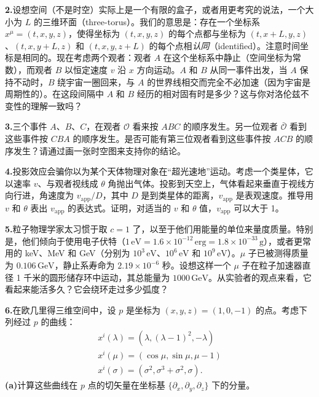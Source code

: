 \textbf{2.}\quad 设想空间（不是时空）实际上是一个有限的盒子，或者用更考究的说法，一个大小为 $L$ 的三维环面（three-torus）。我们的意思是：存在一个坐标系 $x^{\mu}=(t,x,y,z)$，使得坐标为 $(t,x,y,z)$ 的每个点都与坐标为 $(t,x+L,y,z)$、$(t,x,y+L,z)$ 和 $(t,x,y,z+L)$ 的每个点相\emph{认同}（identified）。注意时间坐标是相同的。现在考虑两个观者：观者 $A$ 在这个坐标系中静止（空间坐标为常数），而观者 $B$ 以恒定速度 $v$ 沿 $x$ 方向运动。$A$ 和 $B$ 从同一事件出发，当 $A$ 保持不动时，$B$ 绕宇宙一圈回来，与 $A$ 的世界线相交而完全不必加速（因为宇宙是周期性的）。在这段间隔中 $A$ 和 $B$ 经历的相对固有时是多少？这与你对洛伦兹不变性的理解一致吗？

\textbf{3.}\quad 三个事件 $A$、$B$、$C$，在观者 $\mathcal{O}$ 看来按 $ABC$ 的顺序发生。另一位观者 $\bar{\mathcal{O}}$ 看到这些事件按 $CBA$ 的顺序发生。是否可能有第三位观者看到这些事件按 $ACB$ 的顺序发生？请通过画一张时空图来支持你的结论。

\textbf{4.}\quad 投影效应会骗你以为某个天体物理对象在“超光速地”运动。考虑一个类星体，它以速率 $v$、与观者视线成 $\theta$ 角抛出气体。投影到天空上，气体看起来垂直于视线方向行进，角速度为 $v_{\mathrm{app}}/D$，其中 $D$ 是到类星体的距离，$v_{\mathrm{app}}$ 是表观速度。推导用 $v$ 和 $\theta$ 表出 $v_{\mathrm{app}}$ 的表达式。证明，对适当的 $v$ 和 $\theta$ 值，$v_{\mathrm{app}}$ 可以大于 1。

\textbf{5.}\quad 粒子物理学家太习惯于取 $c=1$ 了，以至于他们用能量的单位来量度质量。特别是，他们倾向于使用电子伏特（$1\,\text{eV} = 1.6\times 10^{-12}\,\text{erg} = 1.8\times 10^{-33}\,\text{g}$），或者更常用的 keV、MeV 和 GeV（分别为 $10^{3}\,\text{eV}$、$10^{6}\,\text{eV}$ 和 $10^{9}\,\text{eV}$）。$\mu$ 子已被测得质量为 $0.106\,\text{GeV}$，静止系寿命为 $2.19\times 10^{-6}$ 秒。设想这样一个 $\mu$ 子在粒子加速器直径 1 千米的圆形储存环中运动，其总能量为 $1000\,\text{GeV}$。从实验者的观点来看，它看起来能活多久？它会绕环走过多少弧度？

\textbf{6.}\quad 在欧几里得三维空间中，设 $p$ 是坐标为 $(x,y,z)=(1,0,-1)$ 的点。考虑下列经过 $p$ 的曲线：
\begin{gather*}
x^{i}(\lambda) = \left(\lambda, (\lambda-1)^{2}, -\lambda\right)\\
x^{i}(\mu) = \left(\cos\mu, \sin\mu, \mu-1\right)\\
x^{i}(\sigma) = \left(\sigma^{2}, \sigma^{3}+\sigma^{2}, \sigma\right).
\end{gather*}
\textbf{(a)}\quad 计算这些曲线在 $p$ 点的切矢量在坐标基 $\{\partial_{x}, \partial_{y}, \partial_{z}\}$ 下的分量。

